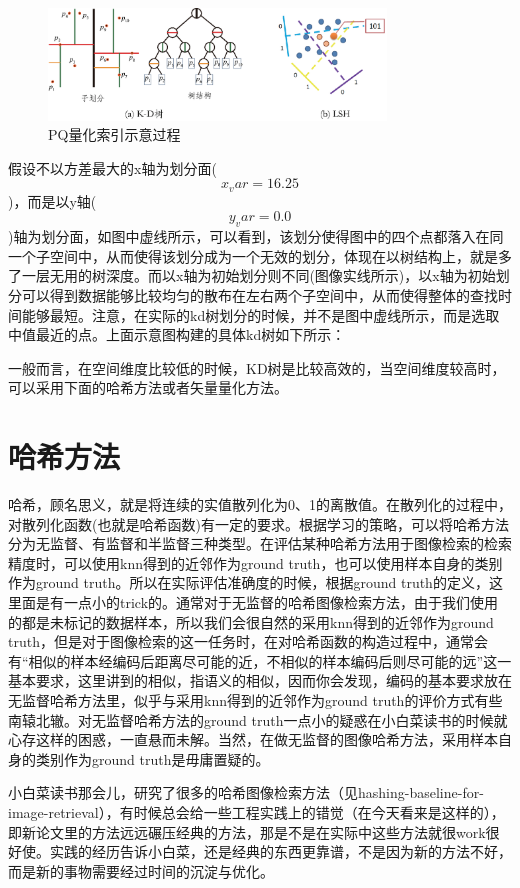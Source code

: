 \documentclass[color=cyan,mathpazo,titlestyle=hang]{elegantbook}
\begin{document}
\begin{figure}[!hbtp]
\centering  %
\includegraphics[width=0.8\textwidth]{./figure/KD-LSH.eps}
\caption{PQ量化索引示意过程\label{pq_ex1}}
\end{figure}

假设不以方差最大的x轴为划分面($$x_var = 16.25$$)，而是以y轴($$y_var = 0.0$$)轴为划分面，如图中虚线所示，可以看到，该划分使得图中的四个点都落入在同一个子空间中，从而使得该划分成为一个无效的划分，体现在以树结构上，就是多了一层无用的树深度。而以x轴为初始划分则不同(图像实线所示)，以x轴为初始划分可以得到数据能够比较均匀的散布在左右两个子空间中，从而使得整体的查找时间能够最短。注意，在实际的kd树划分的时候，并不是图中虚线所示，而是选取中值最近的点。上面示意图构建的具体kd树如下所示：

一般而言，在空间维度比较低的时候，KD树是比较高效的，当空间维度较高时，可以采用下面的哈希方法或者矢量量化方法。

\section{哈希方法}

哈希，顾名思义，就是将连续的实值散列化为0、1的离散值。在散列化的过程中，对散列化函数(也就是哈希函数)有一定的要求。根据学习的策略，可以将哈希方法分为无监督、有监督和半监督三种类型。在评估某种哈希方法用于图像检索的检索精度时，可以使用knn得到的近邻作为ground truth，也可以使用样本自身的类别作为ground truth。所以在实际评估准确度的时候，根据ground truth的定义，这里面是有一点小的trick的。通常对于无监督的哈希图像检索方法，由于我们使用的都是未标记的数据样本，所以我们会很自然的采用knn得到的近邻作为ground truth，但是对于图像检索的这一任务时，在对哈希函数的构造过程中，通常会有“相似的样本经编码后距离尽可能的近，不相似的样本编码后则尽可能的远”这一基本要求，这里讲到的相似，指语义的相似，因而你会发现，编码的基本要求放在无监督哈希方法里，似乎与采用knn得到的近邻作为ground truth的评价方式有些南辕北辙。对无监督哈希方法的ground truth一点小的疑惑在小白菜读书的时候就心存这样的困惑，一直悬而未解。当然，在做无监督的图像哈希方法，采用样本自身的类别作为ground truth是毋庸置疑的。

小白菜读书那会儿，研究了很多的哈希图像检索方法（见hashing-baseline-for-image-retrieval），有时候总会给一些工程实践上的错觉（在今天看来是这样的），即新论文里的方法远远碾压经典的方法，那是不是在实际中这些方法就很work很好使。实践的经历告诉小白菜，还是经典的东西更靠谱，不是因为新的方法不好，而是新的事物需要经过时间的沉淀与优化。
\end{document}
